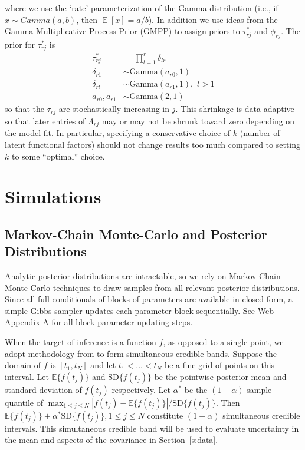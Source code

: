 \documentclass[useAMS,referee,usenatbib]{biom}
\DeclareMathOperator{\E}{\mathbb{E}}
\begin{document}
where we use the `rate' parameterization of the Gamma distribution (i.e., if $x \sim Gamma(a, b)$, then $\E[x] = a/b$). In addition we use ideas from the Gamma Multiplicative Process Prior (GMPP) \citep{Bhattacharya2011, Montagna2012} to assign priors to $\tau^{*}_{rj}$ and $\phi_{rj}$. The prior for $\tau^{*}_{rj}$ is
\begin{align*}
\tau^{*}_{rj} &= \prod_{l=1}^{r}\delta_{lr}\\
\delta_{r1} &\sim \text{Gamma}(a_{r0}, 1)\\
 \delta_{rl} &\sim \text{Gamma}(a_{r1}, 1),\,\, l > 1\\
 a_{r0}, a_{r1} &\sim \text{Gamma}(2,1)
\end{align*}
so that the $\tau_{rj}$ are stochastically increasing in $j$. This shrinkage is data-adaptive so that later entries of $\Lambda_{rj}$ may or may not be shrunk toward zero depending on the model fit. In particular, specifying a conservative choice of $k$ (number of latent functional factors) should not change results too much compared to setting $k$ to some ``optimal'' choice. 

\section{Simulations}
\subsection{Markov-Chain Monte-Carlo and Posterior Distributions}
\label{s:posteriors}
Analytic posterior distributions are intractable, so we rely on Markov-Chain Monte-Carlo techniques to draw samples from all relevant posterior distributions. Since all full conditionals of blocks of parameters are available in closed form, a simple Gibbs sampler updates each parameter block sequentially. See Web Appendix A for all block parameter updating steps.

When the target of inference is a function $f$, as opposed to a single point, we adopt methodology from \citet{Crainiceanu2007} to form simultaneous credible bands. Suppose the domain of $f$ is $[t_{1}, t_{N}]$ and let $t_{1} < \ldots < t_{N}$ be a fine grid of points on this interval. Let $\mathbb{E}\{f(t_{j})\}$ and $\text{SD}\{f(t_{j})\}$ be the pointwise posterior mean and standard deviation of $f(t_{j})$ respectively. Let $\alpha^{*}$ be the $(1-\alpha)$ sample quantile of $\max_{1\leq j \leq N} |f(t_{j}) - \mathbb{E}\{f(t_{j})\}|/\text{SD}\{f(t_{j})\}$. Then $\mathbb{E}\{f(t_{j})\} \pm \alpha^{*} \text{SD}\{f(t_{j})\}, 1\leq j\leq N$ constitute $(1-\alpha)$ simultaneous credible intervals. This simultaneous credible band will be used to evaluate uncertainty in the mean and aspects of the covariance in Section~\ref{s:data}.
\end{document}

